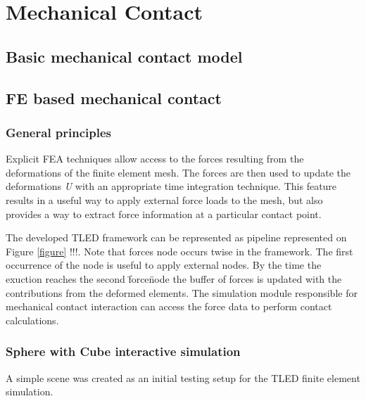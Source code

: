 \chapter{Mechanical Contact}\label{methodology-contact}

\section{Basic mechanical contact model}

\section{FE based mechanical contact}
  \subsection{General principles}

  Explicit FEA techniques allow access to the forces resulting from the deformations of the finite element mesh. The forces are then used to update the deformations \textit{U} with an appropriate time integration technique. This feature results in a useful way to apply external force loads to the mesh, but also provides a way to extract force information at a particular contact point.

  The developed TLED framework can be represented as pipeline represented on Figure \ref{figure} !!!. Note that forces node occurs twise in the framework. The first occurrence of the node is useful to apply external nodes. By the time the exuction reaches the second \"force\" node the buffer of forces is updated with the contributions from the deformed elements. The simulation module responsible for mechanical contact interaction can access the force data to perform contact calculations.

  \subsection{Sphere with Cube interactive simulation}

  A simple scene was created as an initial testing setup for the TLED finite element simulation.
